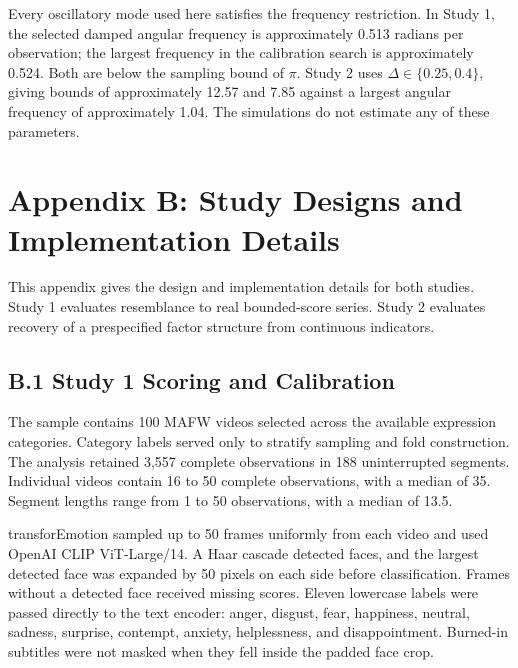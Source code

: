 \documentclass[
]{article}
\begin{document}
Every oscillatory mode used here satisfies the frequency restriction. In
Study 1, the selected damped angular frequency is approximately 0.513
radians per observation; the largest frequency in the calibration search
is approximately 0.524. Both are below the sampling bound of \(\pi\).
Study 2 uses \(\Delta\in\{0.25,0.4\}\), giving bounds of approximately
12.57 and 7.85 against a largest angular frequency of approximately
1.04. The simulations do not estimate any of these parameters.

\newpage

\setcounter{table}{0}
\renewcommand{\thetable}{B\arabic{table}}
\setcounter{figure}{0}
\renewcommand{\thefigure}{B\arabic{figure}}

\section{Appendix B: Study Designs and Implementation
Details}\label{appendix-b-study-designs-and-implementation-details}

This appendix gives the design and implementation details for both
studies. Study 1 evaluates resemblance to real bounded-score series.
Study 2 evaluates recovery of a prespecified factor structure from
continuous indicators.

\subsection{B.1 Study 1 Scoring and
Calibration}\label{b.1-study-1-scoring-and-calibration}

The sample contains 100 MAFW videos selected across the available
expression categories. Category labels served only to stratify sampling
and fold construction. The analysis retained 3,557 complete observations
in 188 uninterrupted segments. Individual videos contain 16 to 50
complete observations, with a median of 35. Segment lengths range from 1
to 50 observations, with a median of 13.5.

transforEmotion sampled up to 50 frames uniformly from each video and
used OpenAI CLIP ViT-Large/14. A Haar cascade detected faces, and the
largest detected face was expanded by 50 pixels on each side before
classification. Frames without a detected face received missing scores.
Eleven lowercase labels were passed directly to the text encoder: anger,
disgust, fear, happiness, neutral, sadness, surprise, contempt, anxiety,
helplessness, and disappointment. Burned-in subtitles were not masked
when they fell inside the padded face crop.
\end{document}

